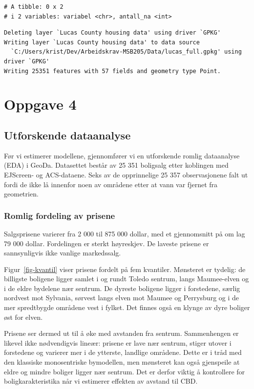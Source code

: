 \documentclass[
  norsk,
  a4paper,
]{article}
\begin{document}
\begin{verbatim}
# A tibble: 0 x 2
# i 2 variables: variabel <chr>, antall_na <int>
\end{verbatim}

\begin{verbatim}
Deleting layer `Lucas County housing data' using driver `GPKG'
Writing layer `Lucas County housing data' to data source 
  `C:/Users/krist/Dev/Arbeidskrav-MSB205/Data/lucas_full.gpkg' using driver `GPKG'
Writing 25351 features with 57 fields and geometry type Point.
\end{verbatim}

\section{Oppgave 4}\label{oppgave-4}

\subsection{Utforskende dataanalyse}\label{sec-eda}

Før vi estimerer modellene, gjennomfører vi en utforskende romlig
dataanalyse (EDA) i GeoDa. Datasettet består av 25 351 boligsalg etter
koblingen med EJScreen- og ACS-dataene. Seks av de opprinnelige 25 357
observasjonene falt ut fordi de ikke lå innenfor noen av områdene etter
at vann var fjernet fra geometrien.

\subsubsection{Romlig fordeling av
prisene}\label{romlig-fordeling-av-prisene}

Salgsprisene varierer fra 2 000 til 875 000 dollar, med et gjennomsnitt
på om lag 79 000 dollar. Fordelingen er sterkt høyreskjev. De laveste
prisene er sannsynligvis ikke vanlige markedssalg.

Figur~\ref{fig-kvantil} viser prisene fordelt på fem kvantiler.
Mønsteret er tydelig: de billigste boligene ligger samlet i og rundt
Toledo sentrum, langs Maumee-elven og i de eldre bydelene nær sentrum.
De dyreste boligene ligger i forstedene, særlig nordvest mot Sylvania,
sørvest langs elven mot Maumee og Perrysburg og i de mer spredtbygde
områdene vest i fylket. Det finnes også en klynge av dyre boliger øst
for elven.

Prisene ser dermed ut til å øke med avstanden fra sentrum. Sammenhengen
er likevel ikke nødvendigvis lineær: prisene er lave nær sentrum, stiger
utover i forstedene og varierer mer i de ytterste, landlige områdene.
Dette er i tråd med den klassiske monosentriske bymodellen, men
mønsteret kan også gjenspeile at eldre og mindre boliger ligger nær
sentrum. Det er derfor viktig å kontrollere for boligkarakteristika når
vi estimerer effekten av avstand til CBD.
\end{document}

